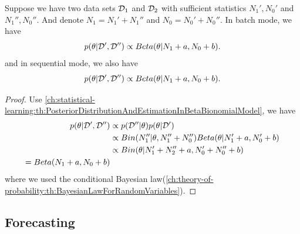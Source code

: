 \begin{refsection}
\begin{lemma}
Suppose we have two data sets $\mathcal{D}_1$ and $\mathcal{D}_2$ with sufficient statistics $N_1',N_0'$ and $N_1'', N_0''$. And denote $N_1 = N_1' + N_1''$ and $N_0 = N_0' + N_0''$.
In batch mode, we have
$$p(\theta|\mathcal{D}',\mathcal{D}'') \propto Beta(\theta|N_1+a,N_0 + b).$$
and in sequential mode, we also have
$$p(\theta|\mathcal{D}',\mathcal{D}'') \propto Beta(\theta|N_1+a,N_0 + b).$$ 	
\end{lemma}
\begin{proof}
Use \autoref{ch:statistical-learning:th:PosteriorDistributionAndEstimationInBetaBionomialModel}, we have
\begin{align*}
p(\theta|\mathcal{D}',\mathcal{D}'') &\propto p(\mathcal{D}''|\theta)p(\theta|\mathcal{D}') \\
&\propto Bin(N_1''|\theta,N_1''+N_0'')Beta(\theta|N_1'+a,N_0'+b) \\
&\propto Bin(\theta| N_1'+ N_2'' + a,N_0'+N_0''+b) \\
=Beta(N_1+ a, N_0+b) 
\end{align*}
where we used the conditional Bayesian law(\autoref{ch:theory-of-probability:th:BayesianLawForRandomVariables}).
\end{proof}

\subsection{Forecasting}


\end{refsection}
